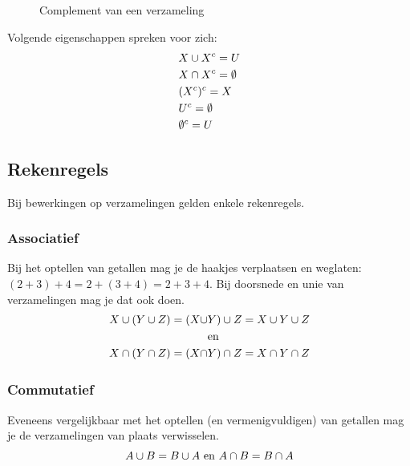\begin{figure}
\centering
{}\qquad
\subfloat[$ \{100,101,102,\dots\}^c=\{0,1,2,\dots,98,99\}$ als $U=\nat$]{
    
    \label{fig:complement_voorbeeld}
}
\caption{Complement van een verzameling}
\end{figure}
Volgende eigenschappen spreken voor zich:
\begin{equation*}
\begin{split}
&X\cup X^c=U \\
&X\cap X^c=\emptyset\\
&(X^c)^c=X\\
& U^c=\emptyset \\
&\emptyset^c=U
\end{split}
\end{equation*}

\subsection{Rekenregels}
\label{subsec:verzRekenregels}
Bij bewerkingen op verzamelingen gelden enkele rekenregels.

\subsubsection{Associatief}
Bij het optellen van getallen mag je de haakjes verplaatsen en weglaten:
$(2+3)+4=2+(3+4)=2+3+4$. Bij doorsnede en unie van verzamelingen mag je dat ook doen.
\begin{equation*}
\begin{split}
X\cup (Y\cup Z)=(X\cup &Y)\cup Z =X\cup Y\cup Z 
\\ &\mathrm{en}\\
X\cap (Y\cap Z)=(X\cap &Y)\cap Z = X\cap Y\cap Z
\end{split}
\end{equation*}
\subsubsection{Commutatief}
Eveneens vergelijkbaar met het optellen (en vermenigvuldigen) van getallen mag je de verzamelingen van plaats verwisselen.
\begin{equation*}
A\cup B=B\cup A ~\mathrm{en}~A\cap B=B\cap A
\end{equation*}

